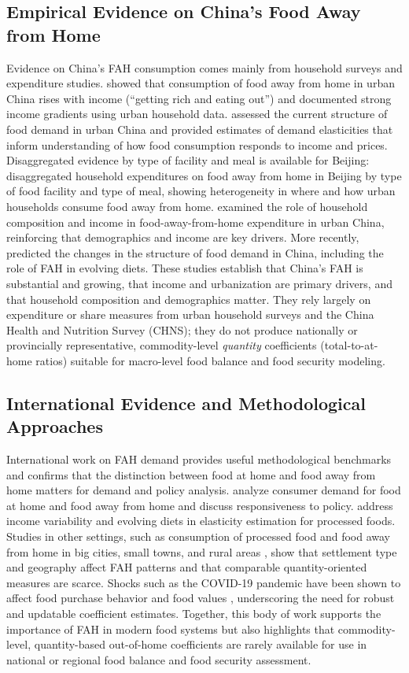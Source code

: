 \subsection{Empirical Evidence on China's Food Away from Home}

Evidence on China's FAH consumption comes mainly from household surveys and expenditure studies. \citet{Ma2006} showed that consumption of food away from home in urban China rises with income (``getting rich and eating out'') and documented strong income gradients using urban household data. \citet{Gould2006} assessed the current structure of food demand in urban China and provided estimates of demand elasticities that inform understanding of how food consumption responds to income and prices. Disaggregated evidence by type of facility and meal is available for Beijing: \citet{Bai2012} disaggregated household expenditures on food away from home in Beijing by type of food facility and type of meal, showing heterogeneity in where and how urban households consume food away from home. \citet{Liu2015} examined the role of household composition and income in food-away-from-home expenditure in urban China, reinforcing that demographics and income are key drivers. More recently, \citet{Zheng2019} predicted the changes in the structure of food demand in China, including the role of FAH in evolving diets. These studies establish that China's FAH is substantial and growing, that income and urbanization are primary drivers, and that household composition and demographics matter. They rely largely on expenditure or share measures from urban household surveys and the China Health and Nutrition Survey (CHNS); they do not produce nationally or provincially representative, commodity-level \emph{quantity} coefficients (total-to-at-home ratios) suitable for macro-level food balance and food security modeling.

\subsection{International Evidence and Methodological Approaches}

International work on FAH demand provides useful methodological benchmarks and confirms that the distinction between food at home and food away from home matters for demand and policy analysis. \citet{Balagtas2023} analyze consumer demand for food at home and food away from home and discuss responsiveness to policy. \citet{Brauw2020} address income variability and evolving diets in elasticity estimation for processed foods. Studies in other settings, such as consumption of processed food and food away from home in big cities, small towns, and rural areas \citep{Sauer2021}, show that settlement type and geography affect FAH patterns and that comparable quantity-oriented measures are scarce. Shocks such as the COVID-19 pandemic have been shown to affect food purchase behavior and food values \citep{Ellison2020}, underscoring the need for robust and updatable coefficient estimates. Together, this body of work supports the importance of FAH in modern food systems but also highlights that commodity-level, quantity-based out-of-home coefficients are rarely available for use in national or regional food balance and food security assessment.

